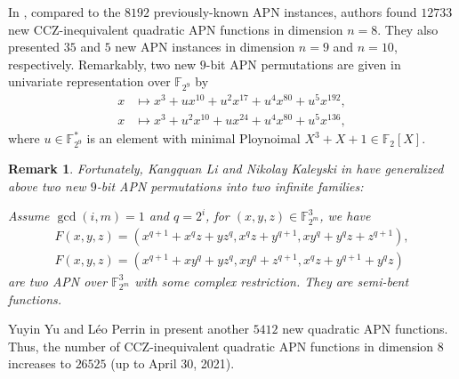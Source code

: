 \documentclass[8pt,oneside]{article}
\newcommand{\0}{\textbf{0}}
\newcommand{\1}{\textbf{1}}
\newcommand{\F}{\mathbb{F}}
\newtheorem{remark}{Remark}
\begin{document}
    In \cite{Beierle2022search_quadAPN}, compared to the $ 8192 $ previously-known APN instances, 
    authors found $ 12733 $ new CCZ-inequivalent quadratic APN functions in dimension $ n=8 $.
    They also presented $ 35 $ and $ 5 $ new APN instances in dimension $ n=9 $ and $ n=10 $, respectively.
    Remarkably, two new $ 9 $-bit APN permutations are given in univariate representation over $ \F_{2^9} $ by 
    \begin{align*}
        x&\mapsto x^3+ux^{10}+u^2x^{17}+u^4x^{80}+u^5x^{192},\\
        x&\mapsto x^3+u^2x^{10}+ux^{24}+u^4x^{80}+u^5x^{136},
    \end{align*}
    where $ u\in\F_{2^9}^* $ is an element with minimal Ploynoimal $ X^3+X+1\in\F_2[X] $. 
    \begin{remark}
        Fortunately, Kangquan Li and Nikolay Kaleyski in \cite{Li2022trivariateAPN} 
        have generalized above two new $ 9 $-bit APN permutations into two infinite families:
        
        Assume $ \gcd(i,m)=1 $ and $ q=2^i $, for $ (x,y,z)\in\F_{2^m}^3 $, we have 
        \begin{align*}
            F(x, y, z) =(x^{q+1} + x^qz + yz^q, x^qz + y^{q+1}, xy^q + y^qz + z^{q+1}),\\
            F(x, y, z) =(x^{q+1} + xy^q + yz^q, xy^q + z^{q+1}, x^qz + y^{q+1} + y^qz)
        \end{align*}
        are two APN over $ \F_{2^m}^3 $ with some complex restriction. They are semi-bent functions.
    \end{remark}
    Yuyin Yu and Léo Perrin in \cite{Yu2022search_quadAPN} present another $ 5412 $ new quadratic APN functions. 
    Thus, the number of CCZ-inequivalent quadratic APN functions in dimension $ 8 $ increases to $ 26525 $ (up to April 30, 2021).
    
\end{document}
